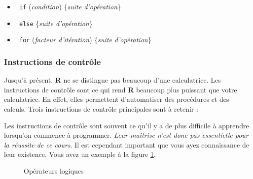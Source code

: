 \documentclass[10.5pt,a4paper]{article}
\newcommand{\rcode}[1]{\texttt{\color{rstudio} #1}}
\begin{document}
       \begin{itemize}
      \item \rcode{if} (\emph{condition}) \{\emph{suite d'opération}\}
      \item \rcode{else} \{\emph{suite d'opération}\}
      \item \rcode{for} (\emph{facteur d'itération}) \{\emph{suite d'opération}\}
    \end{itemize}
     
    \subsubsection{Instructions de contrôle}
  Jusqu'à présent, \textbf{R} ne se distingue pas beaucoup d'une calculatrice. Les instructions de contrôle sont ce qui rend \textbf{R} beaucoup plus puissant que votre calculatrice. En effet, elles permettent d'automatiser des procédures et des calculs. Trois instructions de contrôle principales sont à retenir :
    
    Les instructions de contrôle sont souvent ce qu'il y a de plus difficile à apprendre lorsqu'on commence à programmer. \emph{Leur maîtrise n'est donc pas essentielle pour la réussite de ce cours}. Il est cependant important que vous ayez connaissance de leur existence. Vous avez un exemple à la figure \ref{opeLogi}. %
    
    
    \begin{figure}[H]
    \centering
    \caption{Opérateurs logiques}
    \label{opeLogi}
    \end{figure}
    
\end{document}
